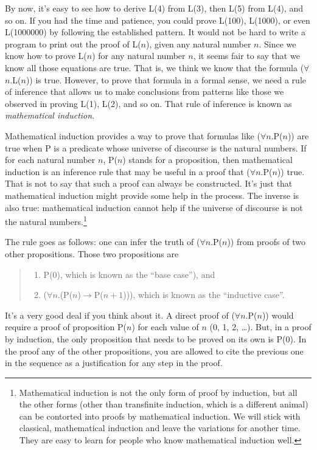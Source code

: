 \label{induction-rationale}
By now, it's easy to see how to derive L(4) from L(3),
then L(5) from L(4), and so on.
If you had the time and patience, you could prove L(100), L(1000), or even L(1000000)
by following the established pattern.
It would not be hard to write a program to print out the proof of L($n$),
given any natural number $n$.
Since we know how to prove L($n$) for any natural number $n$,
it seems fair to say that we know all those equations are true.
That is, we think we know that the formula ($\forall$$n$.L($n$)) is true.
However, to prove that formula in a formal sense,
we need a rule of inference that allows us to make conclusions
from patterns like those we observed in proving L(1), L(2), and so on.
That rule of inference is known as \emph{mathematical induction}.

Mathematical induction provides a way to prove that
formulas like ($\forall$$n$.P($n$)) are true
when P is a predicate whose universe of discourse is the natural numbers.
If for each natural number $n$, P($n$) stands for a proposition,
then mathematical induction is an inference rule that may be useful
in a proof that ($\forall$$n$.P($n$)) true.
That is not to say that such a proof can always be constructed.
It's just that mathematical induction might provide some help in the process.
The inverse is also true: mathematical induction cannot help
if the universe of discourse is not the natural numbers.\footnote{Mathematical
induction is not the only form
of proof by induction, but all the other forms
(other than transfinite induction, which is a different animal)
can be contorted into proofs by mathematical induction.
We will stick with classical, mathematical induction
and leave the variations for another time.
They are easy to learn for people who know mathematical induction well.}

The rule goes as follows: one can infer the truth of ($\forall$$n$.P($n$))
from proofs of two other propositions.
Those two propositions are
\begin{quote}
\begin{enumerate}
\item P(0), which is known as the ``base case''), and
\item ($\forall$$n$.(P($n$)$\rightarrow$P($n+1$))), which is known as the ``inductive case''.
\end{enumerate}
\end{quote}
It's a very good deal if you think about it.
A direct proof of ($\forall$$n$.P($n$)) would require a proof of proposition P($n$)
for each value of $n$ (0, 1, 2, \dots).
But, in a proof by induction,
the only proposition that needs to be proved on its own is P(0).
In the proof any of the other propositions,
you are allowed to cite the previous one in the sequence as a justification for any step in the proof.

